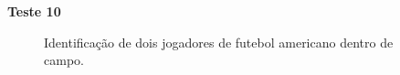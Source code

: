 \textbf{Teste 10}\\
\begin{figure}
    \centering
    \caption{Identificação de dois jogadores de futebol americano dentro de campo.}
\end{figure}